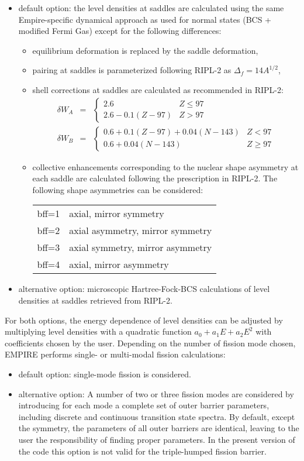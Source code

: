 \documentclass[twocolumn,amsmath,amssymb,10pt,groupedaddress,a4paper]{revtex4}
\begin{document}
\begin{itemize}
\item default option: the level densities at saddles are calculated
using the same Empire-specific dynamical approach as used for normal
states (BCS + modified Fermi Gas) except for the following differences:
\begin{itemize}
\item equilibrium deformation is replaced by the saddle deformation,
\item pairing at saddles is parameterized following RIPL-2 as $\Delta_{f}=14A^{1/2}$,
\item shell corrections at saddles are calculated as recommended in RIPL-2:
\begin{eqnarray}
\delta W_{A}&=&\left\{ \begin{array}{lr}
2.6 & Z\leq97\\
2.6-0.1(Z-97) & Z>97\end{array}\right.\nonumber\\
\delta W_{B}&=&\left\{ \begin{array}{lr}
0.6+0.1(Z-97)+0.04(N-143) & Z<97\\
0.6+0.04(N-143) & Z\geq97\end{array}\right.\nonumber
\end{eqnarray}
\item collective enhancements corresponding to the nuclear shape asymmetry
at each saddle are calculated following the prescription in RIPL-2.
The following shape asymmetries can be considered:
\begin{tabular}{ll}
 bff=1 &
 axial, mirror symmetry\tabularnewline
 bff=2 &
 axial asymmetry, mirror symmetry\tabularnewline
 bff=3 &
 axial symmetry, mirror asymmetry\tabularnewline
 bff=4 &
 axial, mirror asymmetry \tabularnewline
\end{tabular}
\end{itemize}

\item alternative option: microscopic Hartree-Fock-BCS calculations of level densities
at saddles retrieved from RIPL-2.
\end{itemize}
For both options, the energy dependence of level densities
can be adjusted by multiplying level densities with a quadratic function
$a_{0}+a_{1}E+a_{2}E^{2}$ with coefficients chosen by the user.
Depending on the number of fission mode chosen, EMPIRE performs
single- or multi-modal fission calculations:
\begin{itemize}
\item default option: single-mode fission is considered.
\item alternative option: A number of two or three  fission modes are considered by
introducing for each mode a complete set of outer barrier parameters,
including discrete and continuous transition state spectra.
By default, except the symmetry,
the parameters of all outer barriers are identical, leaving to the
user the responsibility of finding proper parameters. In the present
version of the code this option is not valid for the triple-humped
fission barrier.
\end{itemize}
\end{document}
